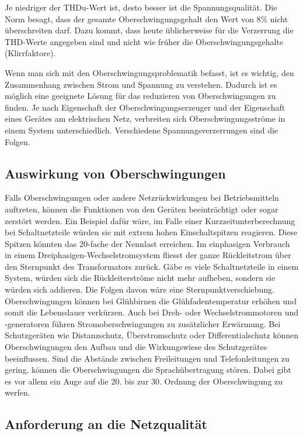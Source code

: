 
Je niedriger der THDu-Wert ist, desto besser ist die Spannungsqualität. Die Norm besagt, dass der gesamte Oberschwingungsgehalt den Wert von 8\% nicht überschreiten darf. Dazu kommt, dass heute üblicherweise für die Verzerrung die THD-Werte angegeben sind und nicht wie früher die Oberschwingungsgehalte (Klirrfaktore).

Wenn man sich mit den Oberschwingungsproblematik befasst, ist es wichtig, den Zusammenhang zwischen Strom und Spannung zu verstehen. Dadurch ist es möglich eine geeignete Lösung für das reduzieren von Oberschwingungen zu finden. 
Je nach Eigenschaft der Oberschwingungserzeuger und der Eigenschaft eines Gerätes am elektrischen Netz, verbreiten sich Oberschwingungsströme in einem System unterschiedlich. Verschiedene Spannungsverzerrungen sind die Folgen. 

\subsection{Auswirkung von Oberschwingungen}

Falls Oberschwingungen oder andere Netzrückwirkungen bei Betriebsmitteln auftreten, können die Funktionen von den Geräten beeinträchtigt oder sogar zerstört werden. Ein Beispiel dafür wäre, im Falle einer Kurzzeitunterberechnung bei Schaltnetzteile würden sie mit extrem hohen Einschaltspitzen reagieren. Diese Spitzen könnten das 20-fache der Nennlast erreichen. Im einphasigen Verbrauch in einem Dreiphasigen-Wechselstromsystem fliesst der ganze Rückleitstrom über den Sternpunkt des Transformators zurück. Gäbe es viele Schaltnetzteile in einem System, würden sich die Rückleiterströme nicht mehr aufheben, sondern sie würden sich addieren. Die Folgen davon wäre eine Sternpunktverschiebung. Oberschwingungen können bei Glühbirnen die Glühfadentemperatur erhöhen und somit die Lebensdauer verkürzen. Auch bei Dreh- oder Wechselstrommotoren und -generatoren führen Stromoberschwingungen zu zusätzlicher Erwärmung. Bei Schutzgeräten wie Distanzschutz, Überstromschutz oder Differentialschutz können Oberschwingungen den Aufbau und die Wirkungswiese des Schutzgerätes beeinflussen. Sind die Abstände zwischen Freileitungen und Telefonleitungen zu gering, können die Oberschwingungen die Sprachübertragung stören. Dabei gibt es vor allem ein Auge auf die 20. bis zur 30. Ordnung der Oberschwingung zu werfen.

\subsection{Anforderung an die Netzqualität}

